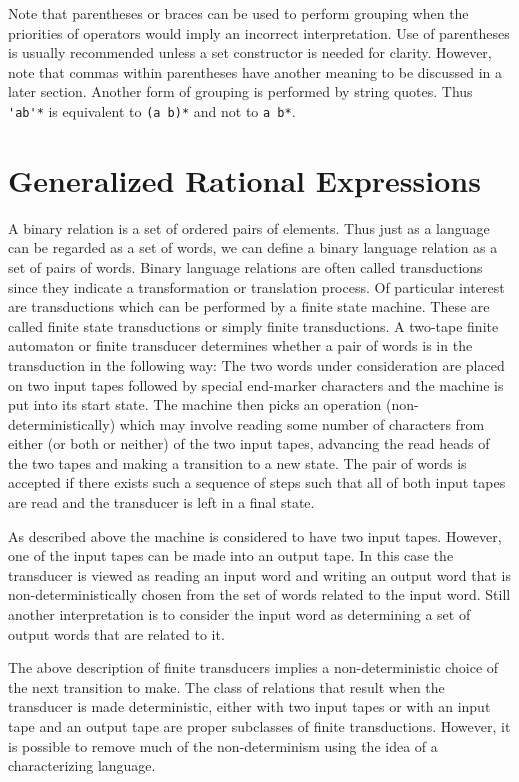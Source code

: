 Note that parentheses or braces can be used to perform grouping when the
priorities of operators would imply an incorrect interpretation.
Use of parentheses is usually recommended unless a set constructor is
needed for clarity.
However, note that commas within parentheses have another meaning to be
discussed in a later section.
Another form of grouping is performed by string quotes.
Thus \verb#'ab'*# is equivalent to \verb#(a b)*# and not to
\verb#a b*#.
\section{Generalized Rational Expressions}
A binary relation is a set of ordered pairs of elements.
Thus just as a language can be regarded as a set of words, we can define a
binary language relation as a set of pairs of words.
Binary language relations are often called transductions since they
indicate a transformation or translation process.
Of particular interest are transductions which can be performed by a finite
state machine.
These are called finite state transductions or simply finite transductions.
A two-tape finite automaton or finite transducer determines whether a pair
of words is in the transduction in the following way:
The two words under consideration are placed on two input tapes followed by
special end-marker characters and the machine is put into its start state.
The machine then picks an operation (non-deterministically) which may
involve reading some number of characters from either (or both or neither)
of the two input tapes, advancing the read heads of the two tapes and
making a transition to a new state.
The pair of words is accepted if there exists such a sequence of steps such
that all of both input tapes are read and the transducer is left in a final
state.

As described above the machine is considered to have two input tapes.
However, one of the input tapes can be made into an output tape.
In this case the transducer is viewed as reading an input word and writing
an output word that is non-deterministically chosen from the set of words
related to the input word.
Still another interpretation is to consider the input word as determining a
set of output words that are related to it.

The above description of finite transducers implies a non-deterministic choice
of the next transition to make.
The class of relations that result when the transducer is made
deterministic, either with two input tapes or with an input tape and an
output tape are proper subclasses of finite transductions.
However, it is possible to remove much of the non-determinism using the
idea of a characterizing language.

